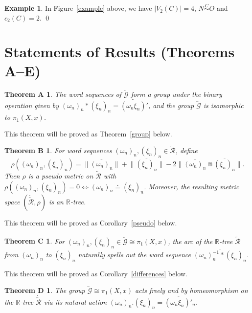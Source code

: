 \documentclass{amsart}
\newtheorem*{TheoremA}{Theorem A}
\newtheorem*{TheoremB}{Theorem B}
\newtheorem*{TheoremC}{Theorem C}
\newtheorem*{TheoremD}{Theorem D}
\theoremstyle{definition}
\newtheorem*{Example}{Example}
\theoremstyle{remark}
\numberwithin{equation}{section}
\begin{document}
\begin{Example}
In Figure~\ref{example} above, we have $|V_2(C)|=4$, $N\stackrel{C}{\sim} O$ and $c_2(C)=2$. \qed
\end{Example}

\section{Statements of Results (Theorems A--E)}\label{results}

\begin{TheoremA} The word sequences of $\overleftarrow{\mathcal G}$  form a group under the binary operation given by $(\omega_n)_n \ast (\xi_n)_n=\overleftarrow{(\omega_n\xi_n)'}$, and the group $\overleftarrow{\mathcal  G}$ is isomorphic to $\pi_1(X,x)$.
\end{TheoremA}

 This theorem will be proved as Theorem~\ref{group} below.

\begin{TheoremB} For word sequences $(\omega_n)_n, (\xi_n)_n\in \overleftarrow{\mathcal R}$, define \[\rho((\omega_n)_n,(\xi_n)_n)=\Big\|\overline{(\omega_n)_n}\Big\|+\Big\|\overline{(\xi_n)_n}\Big\|-2\Big\|\overline{(\omega_n)_n}\Cap \overline{(\xi_n)_n}\Big\|.\] Then $\rho$ is a pseudo metric on $\overleftarrow{\mathcal R}$ with $\rho((\omega_n)_n,(\xi_n)_n)=0 \Leftrightarrow (\omega_n)_n\doteq (\xi_n)_n$.  Moreover, the resulting metric space $(\dot{\overleftarrow{\mathcal R}},\rho)$ is an $\mathbb{R}$-tree.
\end{TheoremB}

 This theorem will be proved as Corollary~\ref{pseudo} below.

\begin{TheoremC}
For $(\omega_n)_n,(\xi_n)_n\in \overleftarrow{\mathcal G}\cong \pi_1(X,x)$, the arc of the $\mathbb{R}$-tree $\dot{\overleftarrow{\mathcal R}}$ from $(\omega_n)_n$ to $(\xi_n)_n$ naturally spells out the word sequence  $\overline{(\omega_n)_n^{-1}\ast (\xi_n)_n}$.
\end{TheoremC}

This theorem will be proved as Corollary~\ref{differences} below.

\begin{TheoremD}
The group $\overleftarrow{\mathcal G}\cong \pi_1(X,x)$ acts freely and by homeomorphism on the $\mathbb{R}$-tree $\dot{\overleftarrow{\mathcal R}}$ via its natural action $(\omega_n)_n.(\xi_n)_n=\overleftarrow{(\omega_n \xi_n)'_n}$.
\end{TheoremD}
\end{document}
